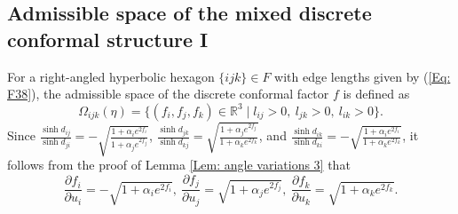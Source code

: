 \documentclass[12pt]{amsart}
\theoremstyle{definition}
\begin{document}
\subsection{Admissible space of the mixed discrete conformal structure I}\label{subsection: AS6}

For a right-angled hyperbolic  hexagon $\{ijk\}\in F$ with edge lengths given by (\ref{Eq: F38}),
the admissible space of the discrete conformal factor $f$ is defined as
\begin{equation*}
\Omega_{ijk}(\eta)=\{(f_i,f_j,f_k)\in \mathbb{R}^3 \mid l_{ij}>0,\  l_{jk}>0,\ l_{ik}>0\}.
\end{equation*}
Since $\frac{\sinh d_{ij}}{\sinh d_{ji}}
=-\sqrt{\frac{1+\alpha_ie^{2f_i}}{1+\alpha_je^{2f_j}}}$,
$\frac{\sinh d_{jk}}{\sinh d_{kj}}
=\sqrt{\frac{1+\alpha_je^{2f_j}}{1+\alpha_ke^{2f_k}}}$, and
$\frac{\sinh d_{ik}}{\sinh d_{ki}}
=-\sqrt{\frac{1+\alpha_ie^{2f_i}}{1+\alpha_ke^{2f_k}}}$,
it follows from the proof of Lemma \ref{Lem: angle variations 3} that 
\begin{equation}\label{Eq: F27}
\frac{\partial f_i}{\partial u_i}=-\sqrt{1+\alpha_ie^{2f_i}},\
\frac{\partial f_j}{\partial u_j}=\sqrt{1+\alpha_je^{2f_j}},\
\frac{\partial f_k}{\partial u_k}=\sqrt{1+\alpha_ke^{2f_k}}.
\end{equation}
\end{document}
